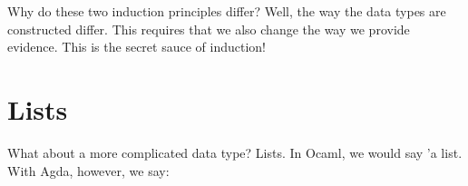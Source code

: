 \documentclass{lecturenotes}
\begin{document}
\begin{center}
    \begin{code}%
%
\>[8]\AgdaSpace{}%
\AgdaSymbol{:}\AgdaSpace{}%
\AgdaSpace{}%
\AgdaSymbol{(}\AgdaSpace{}%
\AgdaSymbol{:}\AgdaSpace{}%
\AgdaSpace{}%
\AgdaSymbol{->}\AgdaSpace{}%
\AgdaSymbol{)}\AgdaSpace{}%
\AgdaSymbol{->}\AgdaSpace{}%
\AgdaSpace{}%
\AgdaSpace{}%
\AgdaSymbol{->}\AgdaSpace{}%
\AgdaSpace{}%
\AgdaSpace{}%
\AgdaSymbol{->}\AgdaSpace{}%
\AgdaSpace{}%
\AgdaSpace{}%
\AgdaSymbol{->}\AgdaSpace{}%
\AgdaSpace{}%
\AgdaSymbol{(}\AgdaSpace{}%
\AgdaSymbol{))}\AgdaSpace{}%
\AgdaSymbol{->}\AgdaSpace{}%
\AgdaSpace{}%
\AgdaSpace{}%
\AgdaSymbol{->}\AgdaSpace{}%
\AgdaSpace{}%
\<%
\\
%
\>[8]\AgdaSpace{}%
\AgdaSpace{}%
\AgdaSpace{}%
\AgdaSpace{}%
\AgdaSpace{}%
\AgdaSymbol{=}\AgdaSpace{}%
\<%
\\
%
\>[8]\AgdaSpace{}%
\AgdaSpace{}%
\AgdaSpace{}%
\AgdaSpace{}%
\AgdaSymbol{(}\AgdaSpace{}%
\AgdaSymbol{)}\AgdaSpace{}%
\AgdaSymbol{=}\AgdaSpace{}%
\AgdaSpace{}%
\AgdaSpace{}%
\AgdaSymbol{(}\AgdaSpace{}%
\AgdaSpace{}%
\AgdaSpace{}%
\AgdaSpace{}%
\AgdaSymbol{)}\<%
\end{code}
\end{center}

Why do these two induction principles differ? 
Well, the way the data types are constructed differ.
This requires that we also change the way we provide evidence.
This is the secret sauce of induction!

\vspace{0.2in}

\section{Lists}
\label{sec:list-types}

What about a more complicated data type? Lists.
In Ocaml, we would say \textsf{'a list}. With Agda, however, we say:
\end{document}
